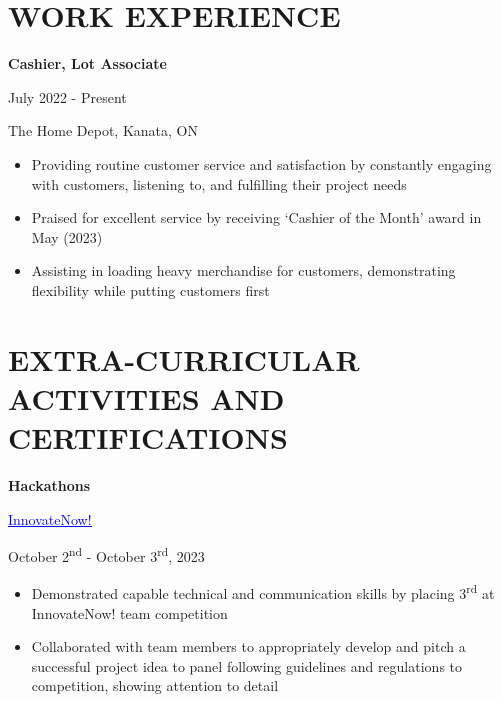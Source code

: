 \documentclass[a4paper,11pt]{article}
\begin{document}
\vspace{2pt}
\section{WORK EXPERIENCE}
\begin{minipage}{.65\linewidth}
    \textbf{Cashier, Lot Associate} 
\end{minipage}
\begin{minipage}{.34\linewidth}
    \flushright
    July 2022 - Present
\end{minipage}
\begin{minipage}{.65\linewidth}
The Home Depot, Kanata, ON
\end{minipage}
\begin{minipage}{\linewidth}
\vspace{10pt}
\begin{itemize}
    \item Providing routine customer service and satisfaction by constantly engaging with customers, listening to, and fulfilling their project needs
    \item Praised for excellent service by receiving ‘Cashier of the Month’ award in May (2023)
    \item Assisting in loading heavy merchandise for customers, demonstrating flexibility while putting customers first
  \end{itemize}
  \end{minipage}

\vspace{2pt}
\section{EXTRA-CURRICULAR ACTIVITIES AND CERTIFICATIONS}

 \begin{minipage}{.65\linewidth}
   \textbf{Hackathons} 
\end{minipage}
 \begin{minipage}{.65\linewidth}
    \href{https://github.com/JeremyFriesenGitHub/InnovateNow}{\textcolor{blue}{\uline{InnovateNow!}}}
\end{minipage}
\begin{minipage}{.34\linewidth}
    \flushright
    October 2\textsuperscript{nd} - October 3\textsuperscript{rd}, 2023
\end{minipage}
\begin{minipage}{\linewidth}
\vspace{10pt}
\begin{itemize}
    \item Demonstrated capable technical and communication skills by placing 3\textsuperscript{rd} at InnovateNow! team competition
    \item Collaborated with team members to appropriately develop and pitch a successful project idea to panel following guidelines and regulations to competition, showing attention to detail
\end{itemize}
\vspace{1pt}
\end{minipage}
\end{document}
